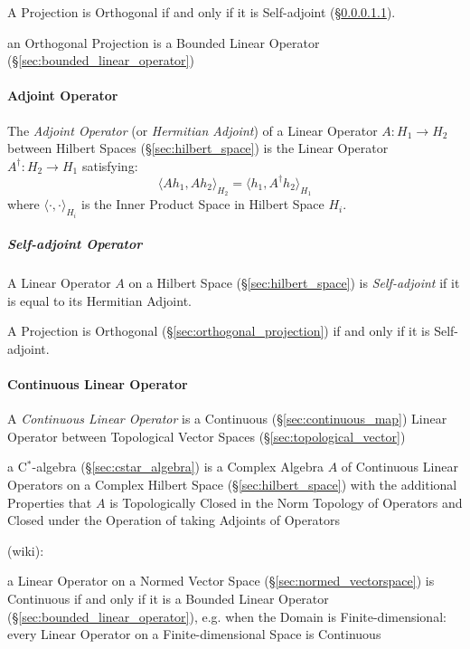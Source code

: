 A Projection is Orthogonal if and only if it is Self-adjoint
(\S\ref{sec:self_adjoint_operator}).

an Orthogonal Projection is a Bounded Linear Operator
(\S\ref{sec:bounded_linear_operator})



\paragraph{Adjoint Operator}\label{sec:adjoint_operator}\hfill

The \emph{Adjoint Operator} (or \emph{Hermitian Adjoint}) of a
Linear Operator $A : H_1 \rightarrow H_2$ between Hilbert Spaces
(\S\ref{sec:hilbert_space}) is the Linear Operator $A^\dag : H_2 \rightarrow
H_1$ satisfying:
\[
  \langle{Ah_1,Ah_2}\rangle_{H_2} = \langle{h_1,A^{\dag}h_2}\rangle_{H_1}
\]
where $\langle\cdot,\cdot\rangle_{H_i}$ is the Inner Product Space in Hilbert
Space $H_i$.




\subparagraph{Self-adjoint Operator}\label{sec:self_adjoint_operator}\hfill

A Linear Operator $A$ on a Hilbert Space (\S\ref{sec:hilbert_space}) is
\emph{Self-adjoint} if it is equal to its Hermitian Adjoint.

A Projection is Orthogonal (\S\ref{sec:orthogonal_projection}) if and only if
it is Self-adjoint.



\paragraph{Continuous Linear Operator}\label{sec:continuous_linear}\hfill

A \emph{Continuous Linear Operator} is a Continuous
(\S\ref{sec:continuous_map}) Linear Operator between Topological
Vector Spaces (\S\ref{sec:topological_vector})

a C$^*$-algebra (\S\ref{sec:cstar_algebra}) is a Complex Algebra $A$
of Continuous Linear Operators on a Complex Hilbert Space
(\S\ref{sec:hilbert_space}) with the additional Properties that $A$ is
Topologically Closed in the Norm Topology of Operators and Closed
under the Operation of taking Adjoints of Operators

(wiki):

a Linear Operator on a Normed Vector Space
(\S\ref{sec:normed_vectorspace}) is Continuous if and only if it is a
Bounded Linear Operator (\S\ref{sec:bounded_linear_operator}), e.g.
when the Domain is Finite-dimensional: every Linear Operator on a
Finite-dimensional Space is Continuous



